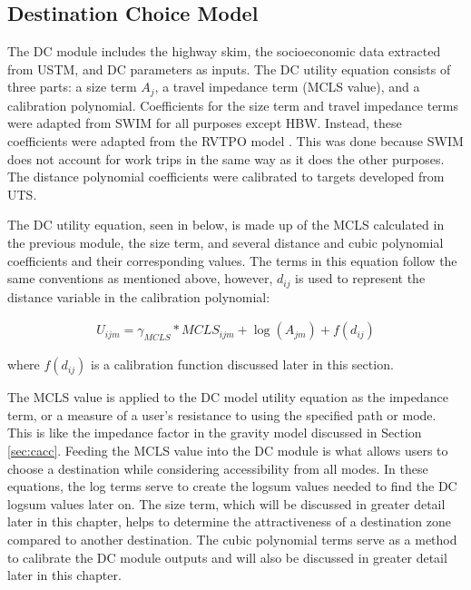 \subsection{Destination Choice Model}
\label{sec:dc}
The DC module
includes the highway skim, the socioeconomic data extracted
from USTM, and DC parameters as inputs.
The DC utility equation consists of three parts: a size term \(A_j\),
a travel impedance term (MCLS value), and a calibration polynomial. Coefficients for the
size term and travel impedance terms were adapted from SWIM \citet{swimversion} for all purposes except HBW. Instead, these coefficients were
adapted from the RVTPO model \citet{rvtpoversion}. This was done because SWIM does not account for work trips in the same way as it does the other purposes. The distance polynomial coefficients were
calibrated to targets developed from UTS.

The DC utility equation, seen in below, is made up of the
MCLS calculated in the previous module, the size term, and several distance and cubic polynomial
coefficients and their corresponding values. The terms in this equation follow the same conventions as mentioned
above, however, \(d_{ij}\) is used to represent the distance variable in the calibration polynomial:

\begin{equation}
\begin{aligned}
	U_{ijm} = \gamma_{MCLS} * MCLS_{ijm} + \log (A_{jm}) + f(d_{ij})
\label{eqn:dc}
\end{aligned}
\end{equation}

\noindent where $f(d_{ij})$ is a calibration function discussed later in this section.

The MCLS value is applied to the DC model utility equation as the impedance
term, or a measure of
a user’s resistance to using the specified path or mode. This is like the
impedance factor in the
gravity model discussed in Section \ref{sec:cacc}. Feeding the MCLS value into
the DC module is what allows
users to choose a destination while considering accessibility from all modes. In these
equations, the log terms serve to create the logsum values needed to find
the DC logsum values later on.
The size term, which
will be discussed in greater detail later in this chapter, helps to determine
the attractiveness
of a destination zone compared to another destination. The cubic polynomial
terms serve as a
method to calibrate the DC module outputs and will also be discussed in
greater detail later in
this chapter.

